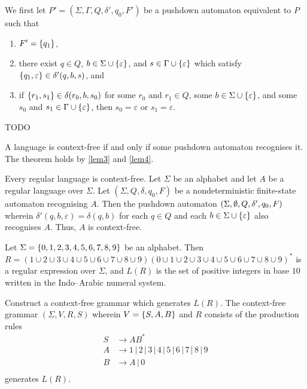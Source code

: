   We first let \(P' = (\Sigma, \Gamma, Q, \delta', q_0, F')\) be a pushdown automaton equivalent to \(P\) such that
  \begin{enumerate}
    \item \(F' = \{q_1\}\),
    \item there exist \(q \in Q\), \(b \in \Sigma \cup \{\varepsilon\}\), and \(s \in \Gamma \cup \{\varepsilon\}\)
    which satisfy \(\{q_1, \varepsilon\} \in \delta'(q, b, s)\), and
    \item if \(\{r_1, s_1\} \in \delta(r_0, b, s_0)\) for some \(r_0\) and \(r_1 \in Q\), some \(b \in \Sigma
    \cup \{\varepsilon\}\), and some \(s_0\) and \(s_1 \in \Gamma \cup \{\varepsilon\}\), then \(s_0 = \varepsilon\)
    or \(s_1 = \varepsilon\).
  \end{enumerate}

  TODO
\Epr

\Bth
  A language is context-free if and only if some pushdown automaton recognises it.
\Eth
\Bpr
  The theorem holds by \autoref{lem3} and \autoref{lem4}.
\Epr

\Bcr
  Every regular language is context-free.
\Ecr
\Bpr
  Let \(\Sigma\) be an alphabet and let \(A\) be a regular language over \(\Sigma\). Let \((\Sigma, Q, \delta, q_0, F)\)
  be a nondeterministic finite-state automaton recognising \(A\). Then the pushdown automaton \((\Sigma, \emptyset, Q,
  \delta', q_0, F)\) wherein \(\delta'(q, b, \varepsilon) = \delta(q, b)\) for each \(q \in Q\) and each \(b \in \Sigma
  \cup \{\varepsilon\}\) also recognises \(A\). Thus, \(A\) is context-free.
\Epr

\Bxr
  Let \(\Sigma = \{0, 1, 2, 3, 4, 5, 6, 7, 8, 9\}\) be an alphabet. Then \(R = (1 \cup 2 \cup 3 \cup 4 \cup 5 \cup 6
  \cup 7 \cup 8 \cup 9) (0 \cup 1 \cup 2 \cup 3 \cup 4 \cup 5 \cup 6 \cup 7 \cup 8 \cup 9)^*\) is a regular expression
  over \(\Sigma\), and \(L(R)\) is the set of positive integers in base \(10\) written in the Indo--Arabic numeral
  system.

  Construct a context-free grammar which generates \(L(R)\).
\Exr
\Bsl
  The context-free grammar \((\Sigma, V, R, S)\) wherein \(V = \{S, A, B\}\) and \(R\) consists of the production
  rules
  \begin{align*}
    S & \to A B^*\\
    A & \to 1 \, | \, 2 \, | \, 3 \, | \, 4 \, | \, 5 \, | \, 6 \, | \, 7 \, | \, 8 \, | \, 9\\
    B & \to A \, | \, 0\\
  \end{align*}
  generates \(L(R)\).
\Esl

